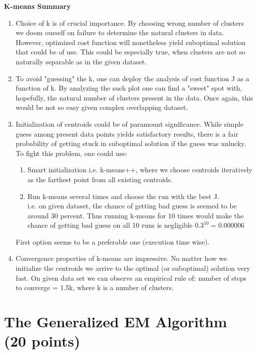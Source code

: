 \documentclass{article}
\begin{document}
\begin{enumerate}
		\pagebreak
		\textbf{K-means Summary}\\
		\begin{enumerate}
			\item Choice of k is of crucial importance. By choosing wrong number of clusters we doom ourself on failure to determine the natural clusters in data. However, optimized cost function will nonetheless yield suboptimal solution that could be of use. This could be especially true, when clusters are not so naturally separable as in the given dataset.
			
			\item To avoid "guessing" the k, one can deploy the analysis of cost function J as a function of k. By analyzing the such plot one can find a "sweet" spot with, hopefully, the natural number of clusters present in the data. Once again, this would be not so easy given complex overlapping dataset. 
			
			\item Initialization of centroids could be of paramount significance. While simple guess among present data points yields satisfactory results, there is a fair probability of getting stuck in suboptimal solution if the guess was unlucky. To fight this problem, one could use:
			\begin{enumerate}
				\item Smart initialization i.e. k-means++, where we choose centroids iteratively as the farthest point from all existing centroids.
				\item Run k-means several times and choose the run with the best J.\\
				i.e. on given dataset, the chance of getting bad guess is seemed to be around 30 percent. Thus running k-means for 10 times would make the chance of getting bad guess on all 10 runs is negligible $0.3^{10} = 0.000006$							
			\end{enumerate}
			First option seems to be a preferable one (execution time wise).
			
			\item Convergence properties of k-means are impressive. No matter how we initialize the centroids we arrive to the optimal (or suboptimal) solution very fast. On given data set we can observe an empirical rule of: number of steps to converge = 1.5k, where k is a number of clusters.  
		\end{enumerate}
\end{enumerate}

\section{The Generalized EM Algorithm (20 points)}
\end{document}

